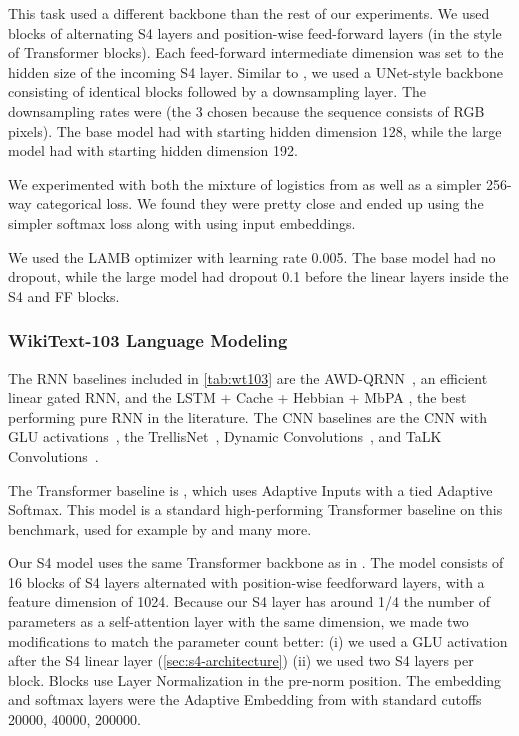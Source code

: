 \documentclass{article}
\newcommand{\methodabbrv}{S4}
\begin{document}
This task used a different backbone than the rest of our experiments.
We used blocks of alternating \methodabbrv{} layers and position-wise feed-forward layers (in the style of Transformer blocks).
Each feed-forward intermediate dimension was set to  the hidden size of the incoming \methodabbrv{} layer.
Similar to \citet{salimans2017pixelcnn++}, we used a UNet-style backbone consisting of  identical blocks followed by a downsampling layer.
The downsampling rates were  (the 3 chosen because the sequence consists of RGB pixels).
The base model had  with starting hidden dimension 128,
while the large model had  with starting hidden dimension 192.

We experimented with both the mixture of logistics from \citep{salimans2017pixelcnn++} as well as a simpler 256-way categorical loss.
We found they were pretty close and ended up using the simpler softmax loss along with using input embeddings.

We used the LAMB optimizer with learning rate 0.005.
The base model had no dropout, while the large model had dropout 0.1 before the linear layers inside the \methodabbrv{} and FF blocks.


\subsubsection{WikiText-103 Language Modeling}
\label{sec:experiment-details-general-wt103}

The RNN baselines included in \cref{tab:wt103} are the
AWD-QRNN~\citep{merity2018scalable}, an efficient linear gated RNN,
and the LSTM + Cache + Hebbian + MbPA \citep{rae2018fast}, the best performing pure RNN in the literature.
The CNN baselines are
the CNN with GLU activations~\citep{dauphin2017language},
the TrellisNet~\citep{trellisnet},
Dynamic Convolutions~\citep{wu2019pay},
and TaLK Convolutions~\citep{lioutas2020time}.

The Transformer baseline is \citep{baevski2018adaptive},
which uses Adaptive Inputs with a tied Adaptive Softmax.
This model is a standard high-performing Transformer baseline on this benchmark,
used for example by \citet{lioutas2020time} and many more.

Our \methodabbrv{} model uses the same Transformer backbone as in \citep{baevski2018adaptive}.
The model consists of 16 blocks of \methodabbrv{} layers alternated with position-wise feedforward layers, with a feature dimension of 1024.
Because our \methodabbrv{} layer has around 1/4 the number of parameters as a self-attention layer with the same dimension, we made two modifications to match the parameter count better:
(i) we used a GLU activation after the \methodabbrv{} linear layer (\cref{sec:s4-architecture})
(ii) we used two \methodabbrv{} layers per block.
Blocks use Layer Normalization in the pre-norm position.
The embedding and softmax layers were the Adaptive Embedding from \citep{baevski2018adaptive} with standard cutoffs 20000, 40000, 200000.
\end{document}
